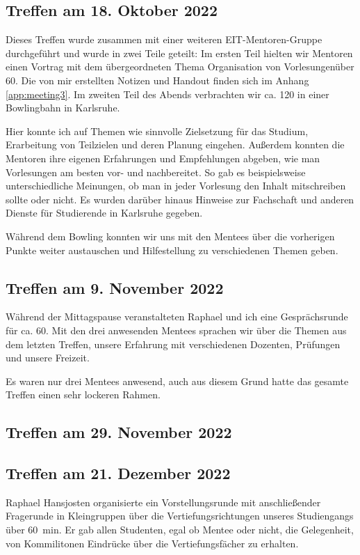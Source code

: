 \documentclass[
    paper=A4,
    div=calc,
    numbers=noendperiod
]{scrartcl}
\begin{document}
\subsection{Treffen am 18. Oktober 2022}
    Dieses Treffen wurde zusammen mit einer weiteren EIT-Mentoren-Gruppe durchgeführt und wurde in zwei Teile geteilt: Im ersten Teil hielten wir Mentoren einen Vortrag mit dem übergeordneten Thema \glqq Organisation von Vorlesungen\grqq über \SI{60}{\min}. Die von mir erstellten Notizen und Handout finden sich im Anhang \ref{app:meeting3}. Im zweiten Teil des Abends verbrachten wir ca. \SI{120}{\min} in einer Bowlingbahn in Karlsruhe.

    Hier konnte ich auf Themen wie sinnvolle Zielsetzung für das Studium, Erarbeitung von Teilzielen und deren Planung eingehen. Außerdem konnten die Mentoren ihre eigenen Erfahrungen und Empfehlungen abgeben, wie man Vorlesungen am besten vor- und nachbereitet. So gab es beispielsweise unterschiedliche Meinungen, ob man in jeder Vorlesung den Inhalt mitschreiben sollte oder nicht. Es wurden darüber hinaus Hinweise zur Fachschaft und anderen Dienste für Studierende in Karlsruhe gegeben.

    Während dem Bowling konnten wir uns mit den Mentees über die vorherigen Punkte weiter austauschen und Hilfestellung zu verschiedenen Themen geben. 

\subsection{Treffen am 9. November 2022}
    Während der Mittagspause veranstalteten Raphael und ich eine Gesprächsrunde für ca. \SI{60}{\min}. Mit den drei anwesenden Mentees sprachen wir über die Themen aus dem letzten Treffen, unsere Erfahrung mit verschiedenen Dozenten, Prüfungen und unsere Freizeit.
    
    Es waren nur drei Mentees anwesend, auch aus diesem Grund hatte das gesamte Treffen einen sehr lockeren Rahmen.

\subsection{Treffen am 29. November 2022}

\subsection{Treffen am 21. Dezember 2022}
    Raphael Hansjosten organisierte ein Vorstellungsrunde mit anschließender Fragerunde in Kleingruppen über die Vertiefungsrichtungen unseres Studiengangs über \SI{60}{min}. Er gab allen Studenten, egal ob Mentee oder nicht, die Gelegenheit, von Kommilitonen Eindrücke über die Vertiefungsfächer zu erhalten.
\end{document}
